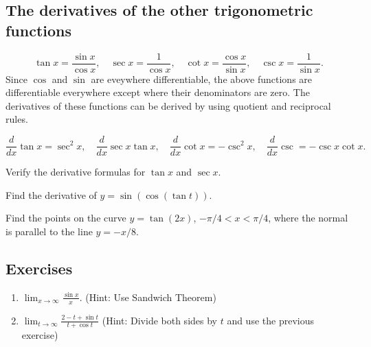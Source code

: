 \documentclass[calc1-main.tex]{subfiles}
\begin{document}
  \subsection*{The derivatives of the other trigonometric functions}
  \[
    \tan x = \frac{\sin x}{\cos x}, \quad
    \sec x = \frac{1}{\cos x}, \quad
    \cot x = \frac{\cos x}{\sin x}, \quad
     \csc x = \frac{1}{\sin x}.
  \]
  Since $\cos$ and $\sin$ are eveywhere differentiable, the above functions are differentiable everywhere except where their denominators are zero. The derivatives of these functions can be derived by using quotient and reciprocal rules.

  \[
    \frac{d}{dx} \tan x= \sec^2 x, \quad
    \frac{d}{dx} \sec x \tan x, \quad
    \frac{d}{dx} \cot x = -\csc^2 x, \quad
    \frac{d}{dx} \csc = -\csc x \cot x.
  \]

  \begin{example}
    Verify the derivative formulas for $\tan x$ and $\sec x$.
  \end{example}
  \begin{example}
    Find the derivative of $y = \sin(\cos(\tan t))$.
  \end{example}

  \begin{example}
    Find the points on the curve $y=\tan(2x)$, $-\pi/4 < x < \pi/4$, where the normal is parallel to the line $y=-x/8$.
  \end{example}

\subsection*{Exercises}
\begin{enumerate}
  \item $\displaystyle \lim_{x \to \infty} \frac{\sin x}{x}$. (Hint: Use Sandwich Theorem)
  \item $\displaystyle \lim_{t \to \infty} \frac{2-t+\sin t}{t+\cos t}$ (Hint: Divide both sides by $t$ and use the previous exercise)
\end{enumerate}
\end{document}
